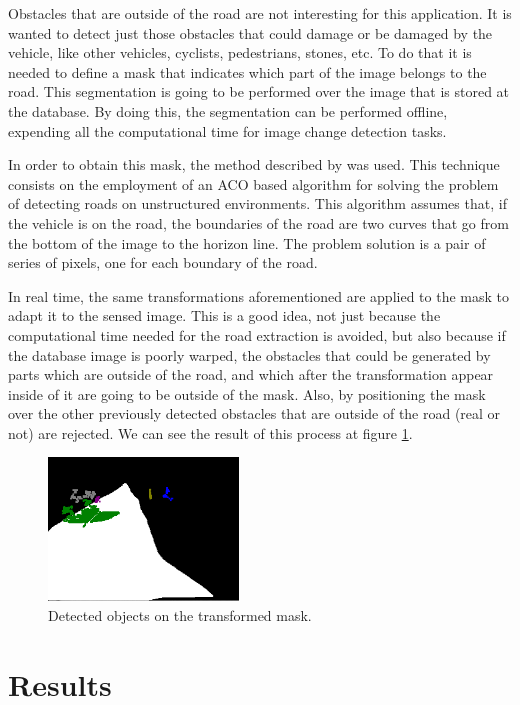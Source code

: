 Obstacles that are outside of the road are not interesting for this application. It is wanted to detect just those obstacles that could damage or be damaged by the vehicle, like other vehicles, cyclists, pedestrians, stones, etc. To do that it is needed to define a mask that indicates which part of the image belongs to the road. This segmentation is going to be performed over the image that is stored at the database. By doing this, the segmentation can be performed offline, expending all the computational time for image change detection tasks.

In order to obtain this mask, the method described by \cite{arnay2009applying} was used. This technique consists on the employment of an \ac{ACO} based algorithm for solving the problem of detecting roads on unstructured environments. This algorithm assumes that, if the vehicle is on the road, the boundaries of the road are two curves that go from the bottom of the image to the horizon line. The problem solution is a pair of series of pixels, one for each boundary of the road.

In real time, the same transformations aforementioned are applied to the mask to adapt it to the sensed image. This is a good idea, not just because the computational time needed for the road extraction is avoided, but also because if the database image is poorly warped, the obstacles that could be generated by parts which are outside of the road, and which after the transformation appear inside of it are going to be outside of the mask. Also, by positioning the mask over the other previously detected obstacles that are outside of the road (real or not) are rejected. We can see the result of this process at figure \ref{fig:cp01_mask_warped}.

\begin{figure}[h!]
\centering
\includegraphics[width=0.45\textwidth]{maskWarped}
\caption{Detected objects on the transformed mask.}\label{fig:cp01_mask_warped}
\end{figure}

\section{Results}\label{ch:chapter01_02}

